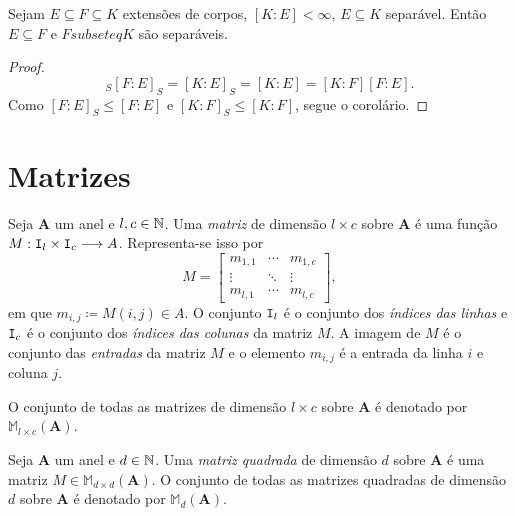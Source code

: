 \begin{coro}
	Sejam $E \subseteq F \subseteq K$ extensões de corpos, $[K:E] < \infty$, $E \subseteq K$ separável. Então $E \subseteq F$ e $F subseteq K$ são separáveis.
\end{coro}
\begin{proof}
	\begin{equation*}
	[K:F]_S [F:E]_S = [K:E]_S = [K:E] = [K:F][F:E].
	\end{equation*}
	Como $[F:E]_S \leq [F:E]$ e $[K:F]_S \leq [K:F]$, segue o corolário.
\end{proof}

























\newpage

\chapter{Matrizes}

\begin{defi}
	Seja $\bm A$ um anel e $l,c \in \mathbb{N}$. Uma \emph{matriz} de dimensão $l \times c$ sobre $\bm A$ é uma função $M: \mathtt I_l \times \mathtt I_c \longrightarrow A$. Representa-se isso por
	\begin{equation*}
	M =
	\begin{bmatrix}
	m_{1,1} & \cdots & m_{1,c} \\
	\vdots & \ddots & \vdots \\
	m_{l,1} & \cdots & m_{l,c}
	\end{bmatrix},
	\end{equation*}
em que $m_{i,j} \coloneqq M(i,j) \in A$. O conjunto $\mathtt I_l$ é o conjunto dos \emph{índices das linhas} e $\mathtt I_c$ é o conjunto dos \emph{índices das colunas} da matriz $M$. A imagem de $M$ é o conjunto das \emph{entradas} da matriz $M$ e o elemento $m_{i,j}$ é a entrada da linha $i$ e coluna $j$.

	O conjunto de todas as matrizes de dimensão $l \times c$ sobre $\bm A$ é denotado por $\mathbb M_{l \times c}(\bm A)$.
\end{defi}

\begin{defi}
	Seja $\bm A$ um anel e $d \in \mathbb{N}$. Uma \emph{matriz quadrada} de dimensão $d$ sobre $\bm A$ é uma matriz $M \in \mathbb M_{d \times d}(\bm A)$. O conjunto de todas as matrizes quadradas de dimensão $d$ sobre $\bm A$ é denotado por $\mathbb M_d(\bm A)$.
\end{defi}

